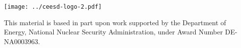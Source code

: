 
\begin{frame}\frametitle{}

\vspace*{0.2in}

\begin{center}

\texttt{[image: ../ceesd-logo-2.pdf]}

\vspace*{0.35in}

\vspace*{0.5in}
\begin{minipage}{0.6\textwidth}
This material is based in part upon work supported by the Department of Energy, National Nuclear Security Administration, under Award Number DE-NA0003963. 
\end{minipage}



\end{center}


\end{frame}
